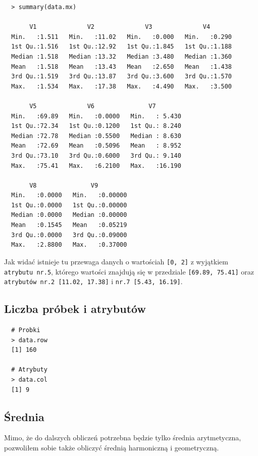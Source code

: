\documentclass[a4paper,12pt,twoside]{article}
\begin{document}
\medskip
\begin{lstlisting}
  > summary(data.mx)

       V1              V2              V3              V4
  Min.   :1.511   Min.   :11.02   Min.   :0.000   Min.   :0.290
  1st Qu.:1.516   1st Qu.:12.92   1st Qu.:1.845   1st Qu.:1.188
  Median :1.518   Median :13.32   Median :3.480   Median :1.360
  Mean   :1.518   Mean   :13.43   Mean   :2.650   Mean   :1.438
  3rd Qu.:1.519   3rd Qu.:13.87   3rd Qu.:3.600   3rd Qu.:1.570
  Max.   :1.534   Max.   :17.38   Max.   :4.490   Max.   :3.500

       V5              V6               V7
  Min.   :69.89   Min.   :0.0000   Min.   : 5.430
  1st Qu.:72.34   1st Qu.:0.1200   1st Qu.: 8.240
  Median :72.78   Median :0.5500   Median : 8.630
  Mean   :72.69   Mean   :0.5096   Mean   : 8.952
  3rd Qu.:73.10   3rd Qu.:0.6000   3rd Qu.: 9.140
  Max.   :75.41   Max.   :6.2100   Max.   :16.190

       V8               V9
  Min.   :0.0000   Min.   :0.00000
  1st Qu.:0.0000   1st Qu.:0.00000
  Median :0.0000   Median :0.00000
  Mean   :0.1545   Mean   :0.05219
  3rd Qu.:0.0000   3rd Qu.:0.09000
  Max.   :2.8800   Max.   :0.37000
\end{lstlisting}
\medskip

Jak widać istnieje tu przewaga danych o wartościah \texttt{[0, 2]} z wyjątkiem \texttt{atrybutu nr.5},
którego wartości znajdują się w przedziale \texttt{[69.89, 75.41]} oraz \texttt{atrybutów nr.2 [11.02, 17.38]}
i \texttt{nr.7 [5.43, 16.19]}.

\subsection{Liczba próbek i atrybutów}

\begin{lstlisting}
  # Probki
  > data.row
  [1] 160

  # Atrybuty
  > data.col
  [1] 9
\end{lstlisting}

\subsection{Średnia}

Mimo, że do dalszych obliczeń potrzebna będzie tylko średnia arytmetyczna, pozwoliłem sobie także
obliczyć średnią harmoniczną i geometryczną.
\end{document}
